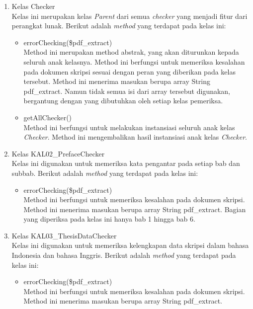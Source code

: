 \begin{enumerate}

	\item Kelas Checker \\
	Kelas ini merupakan kelas \textit{Parent} dari semua \textit{checker} yang menjadi fitur dari perangkat lunak. Berikut adalah \textit{method} yang terdapat pada kelas ini:
	
		\begin{itemize}
			\item errorChecking(\$pdf\_extract) \\
			Method ini merupakan method abstrak, yang akan diturunkan kepada seluruh anak kelasnya. Method ini berfungsi untuk memeriksa kesalahan pada dokumen skripsi sesuai dengan peran yang diberikan pada kelas tersebut. Method ini menerima masukan berupa array String pdf\_extract. Namun tidak semua isi dari array tersebut digunakan, bergantung dengan yang dibutuhkan oleh setiap kelas pemeriksa.			
			
			\item getAllChecker() \\
			Method ini berfungsi untuk melakukan instansiasi seluruh anak kelas \textit{Checker}. Method ini mengembalikan hasil instansiasi anak kelas \textit{Checker}.
		\end{itemize}
	
	\item Kelas KAL02\_PrefaceChecker \\
	Kelas ini digunakan untuk memeriksa kata pengantar pada setiap bab dan subbab. Berikut adalah \textit{method} yang terdapat pada kelas ini:
	
		\begin{itemize}
			\item errorChecking(\$pdf\_extract) \\
			Method ini berfungsi untuk memeriksa kesalahan pada dokumen skripsi. Method ini menerima masukan berupa array String pdf\_extract. Bagian yang diperiksa pada kelas ini hanya bab 1 hingga bab 6.
		\end{itemize}
	
	\item Kelas KAL03\_ThesisDataChecker \\
	Kelas ini digunakan untuk memeriksa kelengkapan data skripsi dalam bahasa Indonesia dan bahasa Inggris. Berikut adalah \textit{method} yang terdapat pada kelas ini:
			
		\begin{itemize}
			\item errorChecking(\$pdf\_extract) \\
			Method ini berfungsi untuk memeriksa kesalahan pada dokumen skripsi. Method ini menerima masukan berupa array String pdf\_extract.
		\end{itemize}
		

\end{enumerate}
